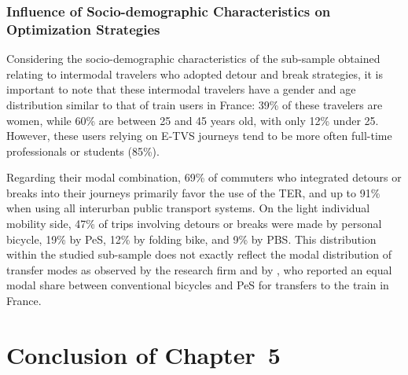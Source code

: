 \begin{refsegment}
\subsubsection*{Influence of Socio-demographic Characteristics on Optimization Strategies
    \label{chap5:sociodemographie}
    }

Considering the socio-demographic characteristics of the sub-sample obtained relating to intermodal travelers who adopted detour and break strategies, it is important to note that these intermodal travelers have a gender and age distribution similar to that of train users in France: 39\% of these travelers are women, while 60\% are between 25 and 45 years old, with only 12\% under 25. However, these users relying on \acrshort{E-TVS} journeys tend to be more often full-time professionals or students (85\%).%

Regarding their modal combination, 69\% of commuters who integrated detours or breaks into their journeys primarily favor the use of the \acrshort{TER}, and up to 91\% when using all interurban public transport systems. On the light individual mobility side, 47\% of trips involving detours or breaks were made by personal bicycle, 19\% by \acrshort{PeS}, 12\% by folding bike, and 9\% by \acrshort{PBS}. This distribution within the studied sub-sample does not exactly reflect the modal distribution of transfer modes as observed by the research firm \textcolor{blue}{\textcite{enov_enquete_2021}} and by \textcolor{blue}{\textcite[180]{moinse_intermodal_2022}}, who reported an equal modal share between conventional bicycles and \acrshort{PeS} for transfers to the train in France.%

\newpage
{} %
\section*{Conclusion of Chapter~5
    \label{chap5:conclusion}
    }


\end{refsegment}

